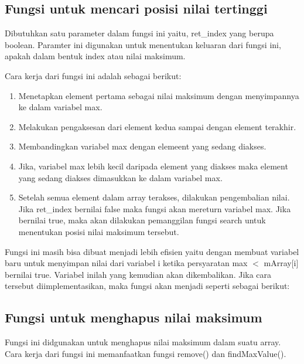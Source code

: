 \documentclass[]{article}
\begin{document}
\subsection{Fungsi untuk mencari posisi nilai tertinggi}

\par
Dibutuhkan satu parameter dalam fungsi ini yaitu, ret\_index yang berupa boolean. Paramter ini digunakan untuk menentukan keluaran dari fungsi ini, apakah dalam bentuk index atau nilai maksimum.
\par
Cara kerja dari fungsi ini adalah sebagai berikut:
\begin{enumerate}
	\item Menetapkan element pertama sebagai nilai maksimum dengan menyimpannya ke dalam variabel max.
	\item Melakukan pengaksesan dari element kedua sampai dengan element terakhir.
	\item Membandingkan  variabel max dengan elemeent yang sedang diakses.
	\item Jika, variabel max lebih kecil daripada element yang diakses maka element yang sedang diakses dimasukkan ke dalam variabel max.
	\item Setelah semua element dalam array terakses, dilakukan pengembalian nilai. Jika ret\_index bernilai false maka fungsi akan mereturn variabel max. Jika bernilai true, maka akan dilakukan pemanggilan fungsi search untuk menentukan posisi nilai maksimum tersebut.
\end{enumerate}
\par
Fungsi ini masih bisa dibuat menjadi lebih efisien yaitu dengan membuat variabel baru untuk menyimpan nilai dari variabel i ketika persyaratan max $<$ mArray[i] bernilai true. Variabel inilah yang kemudian akan dikembalikan. Jika cara tersebut diimplementasikan, maka fungsi akan menjadi seperti sebagai berikut:

\subsection{Fungsi untuk menghapus nilai maksimum}

\par
Fungsi ini didgunakan untuk menghapus nilai maksimum dalam suatu array. Cara kerja dari fungsi ini memanfaatkan fungsi remove() dan findMaxValue(). 
\end{document}
